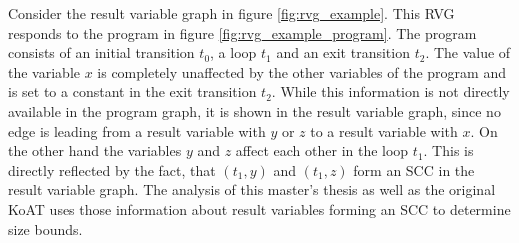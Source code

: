 

Consider the result variable graph in figure \ref{fig:rvg_example}.
This RVG responds to the program in figure \ref{fig:rvg_example_program}.
The program consists of an initial transition $t_0$, a loop $t_1$ and an exit transition $t_2$.
The value of the variable $x$ is completely unaffected by the other variables of the program and is set to a constant in the exit transition $t_2$.
While this information is not directly available in the program graph, it is shown in the result variable graph, since no edge is leading from a result variable with $y$ or $z$ to a result variable with $x$.
On the other hand the variables $y$ and $z$ affect each other in the loop $t_1$.
This is directly reflected by the fact, that $(t_1,y)$ and $(t_1,z)$ form an SCC in the result variable graph.
The analysis of this master's thesis as well as the original KoAT uses those information about result variables forming an SCC to determine size bounds.
